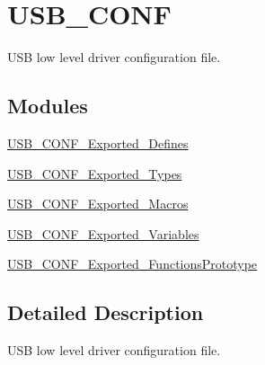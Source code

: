 \hypertarget{group__USB__CONF}{\section{U\-S\-B\-\_\-\-C\-O\-N\-F}
\label{group__USB__CONF}
}


U\-S\-B low level driver configuration file.  


\subsection*{Modules}
\begin{DoxyCompactItemize}
\item 
\hyperlink{group__USB__CONF__Exported__Defines}{U\-S\-B\-\_\-\-C\-O\-N\-F\-\_\-\-Exported\-\_\-\-Defines}
\item 
\hyperlink{group__USB__CONF__Exported__Types}{U\-S\-B\-\_\-\-C\-O\-N\-F\-\_\-\-Exported\-\_\-\-Types}
\item 
\hyperlink{group__USB__CONF__Exported__Macros}{U\-S\-B\-\_\-\-C\-O\-N\-F\-\_\-\-Exported\-\_\-\-Macros}
\item 
\hyperlink{group__USB__CONF__Exported__Variables}{U\-S\-B\-\_\-\-C\-O\-N\-F\-\_\-\-Exported\-\_\-\-Variables}
\item 
\hyperlink{group__USB__CONF__Exported__FunctionsPrototype}{U\-S\-B\-\_\-\-C\-O\-N\-F\-\_\-\-Exported\-\_\-\-Functions\-Prototype}
\end{DoxyCompactItemize}


\subsection{Detailed Description}
U\-S\-B low level driver configuration file. 